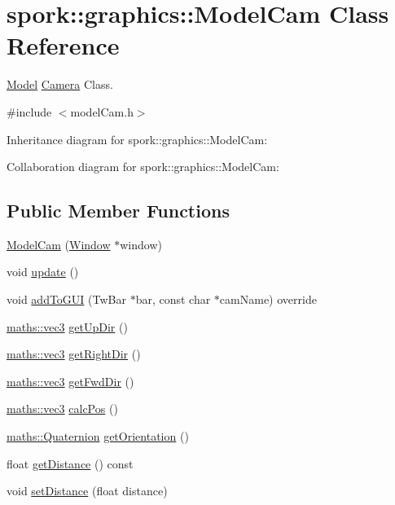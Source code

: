 \hypertarget{classspork_1_1graphics_1_1_model_cam}{}\section{spork\+:\+:graphics\+:\+:Model\+Cam Class Reference}
\label{classspork_1_1graphics_1_1_model_cam}


\hyperlink{classspork_1_1graphics_1_1_model}{Model} \hyperlink{classspork_1_1graphics_1_1_camera}{Camera} Class.  




{\ttfamily \#include $<$model\+Cam.\+h$>$}



Inheritance diagram for spork\+:\+:graphics\+:\+:Model\+Cam\+:


Collaboration diagram for spork\+:\+:graphics\+:\+:Model\+Cam\+:
\subsection*{Public Member Functions}
\begin{DoxyCompactItemize}
\item 
\hyperlink{classspork_1_1graphics_1_1_model_cam_a54380c21aa0b4b738cfa1d00e37ae477}{Model\+Cam} (\hyperlink{classspork_1_1graphics_1_1_window}{Window} $\ast$window)
\item 
void \hyperlink{classspork_1_1graphics_1_1_model_cam_a3cf2a36ae3ad1b81dce99ee063a460be}{update} ()
\item 
void \hyperlink{classspork_1_1graphics_1_1_model_cam_ade4df0e81cc325af221081634384783d}{add\+To\+G\+UI} (Tw\+Bar $\ast$bar, const char $\ast$cam\+Name) override
\item 
\hyperlink{structspork_1_1maths_1_1vec3}{maths\+::vec3} \hyperlink{classspork_1_1graphics_1_1_model_cam_ab5384be317526c2839bc736f6c779bd0}{get\+Up\+Dir} ()
\item 
\hyperlink{structspork_1_1maths_1_1vec3}{maths\+::vec3} \hyperlink{classspork_1_1graphics_1_1_model_cam_ad9b3a5d537feca1d93b6583a2f894c67}{get\+Right\+Dir} ()
\item 
\hyperlink{structspork_1_1maths_1_1vec3}{maths\+::vec3} \hyperlink{classspork_1_1graphics_1_1_model_cam_a93058ea250c97b9bcc03b5d3e7f7c127}{get\+Fwd\+Dir} ()
\item 
\hyperlink{structspork_1_1maths_1_1vec3}{maths\+::vec3} \hyperlink{classspork_1_1graphics_1_1_model_cam_a75760cf6f052df0409086db00d710dc7}{calc\+Pos} ()
\item 
\hyperlink{structspork_1_1maths_1_1_quaternion}{maths\+::\+Quaternion} \hyperlink{classspork_1_1graphics_1_1_model_cam_ab852f0da194a83225084c2a7318034fb}{get\+Orientation} ()
\item 
float \hyperlink{classspork_1_1graphics_1_1_model_cam_aea5b9f2322a418e278ba0f730793eb6f}{get\+Distance} () const
\item 
void \hyperlink{classspork_1_1graphics_1_1_model_cam_ae08f0327166753ed9c19f319fd2131f5}{set\+Distance} (float distance)
\end{DoxyCompactItemize}
